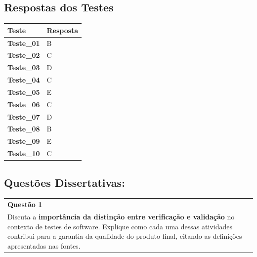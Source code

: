 \documentclass[
]{book}
\begin{document}
\subsection{Respostas dos Testes}\label{respostas-dos-testes}

\begin{longtable}[]{@{}ll@{}}
\toprule\noalign{}
Teste & Resposta \\
\midrule\noalign{}
\endhead
\bottomrule\noalign{}
\endlastfoot
\textbf{Teste\_01} & B \\
\textbf{Teste\_02} & C \\
\textbf{Teste\_03} & D \\
\textbf{Teste\_04} & C \\
\textbf{Teste\_05} & E \\
\textbf{Teste\_06} & C \\
\textbf{Teste\_07} & D \\
\textbf{Teste\_08} & B \\
\textbf{Teste\_09} & E \\
\textbf{Teste\_10} & C \\
\end{longtable}

\subsection{Questões Dissertativas:}\label{questuxf5es-dissertativas}

\begin{longtable}[]{@{}
  >{\raggedright\arraybackslash}p{}@{}}
\toprule\noalign{}
\endhead
\bottomrule\noalign{}
\endlastfoot
\textbf{Questão 1} \\
Discuta a \textbf{importância da distinção entre verificação e validação} no contexto de testes de software. Explique como cada uma dessas atividades contribui para a garantia da qualidade do produto final, citando as definições apresentadas nas fontes. \\
\end{longtable}
\end{document}
